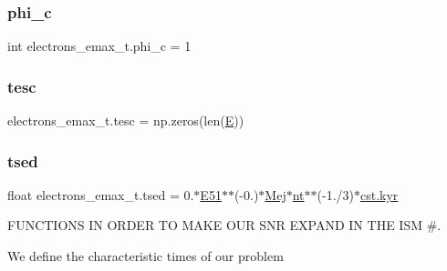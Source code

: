 \mbox{\label{namespaceelectrons__emax__t_a7f204cad5b45e51bb9dccc93880d31cc}} 
\subsubsection{\texorpdfstring{phi\+\_\+c}{phi\_c}}
{\footnotesize\ttfamily int electrons\+\_\+emax\+\_\+t.\+phi\+\_\+c = 1}

\mbox{\label{namespaceelectrons__emax__t_ab359238c0d5653f3ae8505264cff2947}} 
\subsubsection{\texorpdfstring{tesc}{tesc}}
{\footnotesize\ttfamily electrons\+\_\+emax\+\_\+t.\+tesc = np.\+zeros(len(\hyperlink{namespaceelectrons__emax__t_a887d1266ad684afdfee916581795c117}{E}))}

\mbox{\label{namespaceelectrons__emax__t_a6fb496915cb2791785758534ac0a8ad6}} 
\subsubsection{\texorpdfstring{tsed}{tsed}}
{\footnotesize\ttfamily float electrons\+\_\+emax\+\_\+t.\+tsed = 0.$\ast$\hyperlink{namespaceelectrons__emax__t_a60b4c05f730fff0bc98b225162ee76c3}{E51}$\ast$$\ast$(-\/0.)$\ast$\hyperlink{namespaceelectrons__emax__t_a9373df60b4e1199cb22af1e4a4316073}{Mej}$\ast$\hyperlink{namespaceelectrons__emax__t_af39d537cdc6ea46e3e9f97d4d3f61a07}{nt}$\ast$$\ast$(-\/1./3)$\ast$\hyperlink{constants_8h_a0edf155739e92555799f4a04b10af6bf}{cst.\+kyr}}



F\+U\+N\+C\+T\+I\+O\+NS IN O\+R\+D\+ER TO M\+A\+KE O\+UR S\+NR E\+X\+P\+A\+ND IN T\+HE I\+SM \#. 

We define the characteristic times of our problem \mbox{\label{namespaceelectrons__emax__t_a9fde8350249696a36959b975c66a05ed}} 
